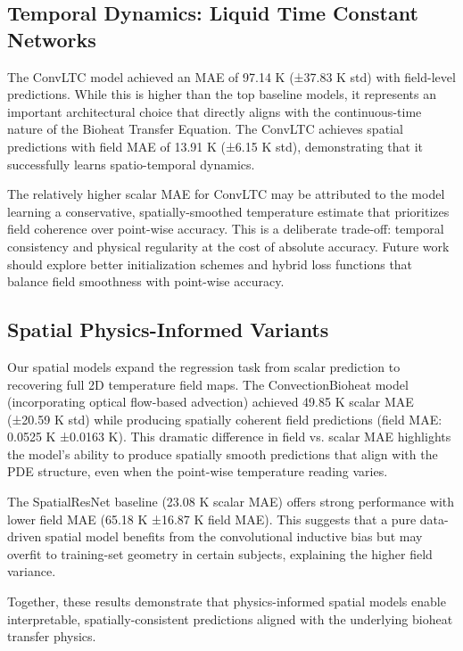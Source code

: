 
\subsection{Temporal Dynamics: Liquid Time Constant Networks}
The ConvLTC model achieved an MAE of 97.14 K (±37.83 K std) with field-level predictions. While this is higher than the top baseline models, it represents an important architectural choice that directly aligns with the continuous-time nature of the Bioheat Transfer Equation. The ConvLTC achieves spatial predictions with field MAE of 13.91 K (±6.15 K std), demonstrating that it successfully learns spatio-temporal dynamics.

The relatively higher scalar MAE for ConvLTC may be attributed to the model learning a conservative, spatially-smoothed temperature estimate that prioritizes field coherence over point-wise accuracy. This is a deliberate trade-off: temporal consistency and physical regularity at the cost of absolute accuracy. Future work should explore better initialization schemes and hybrid loss functions that balance field smoothness with point-wise accuracy.

\subsection{Spatial Physics-Informed Variants}
Our spatial models expand the regression task from scalar prediction to recovering full 2D temperature field maps. The ConvectionBioheat model (incorporating optical flow-based advection) achieved 49.85 K scalar MAE (±20.59 K std) while producing spatially coherent field predictions (field MAE: 0.0525 K ±0.0163 K). This dramatic difference in field vs. scalar MAE highlights the model's ability to produce spatially smooth predictions that align with the PDE structure, even when the point-wise temperature reading varies.

The SpatialResNet baseline (23.08 K scalar MAE) offers strong performance with lower field MAE (65.18 K ±16.87 K field MAE). This suggests that a pure data-driven spatial model benefits from the convolutional inductive bias but may overfit to training-set geometry in certain subjects, explaining the higher field variance.

Together, these results demonstrate that physics-informed spatial models enable interpretable, spatially-consistent predictions aligned with the underlying bioheat transfer physics.
